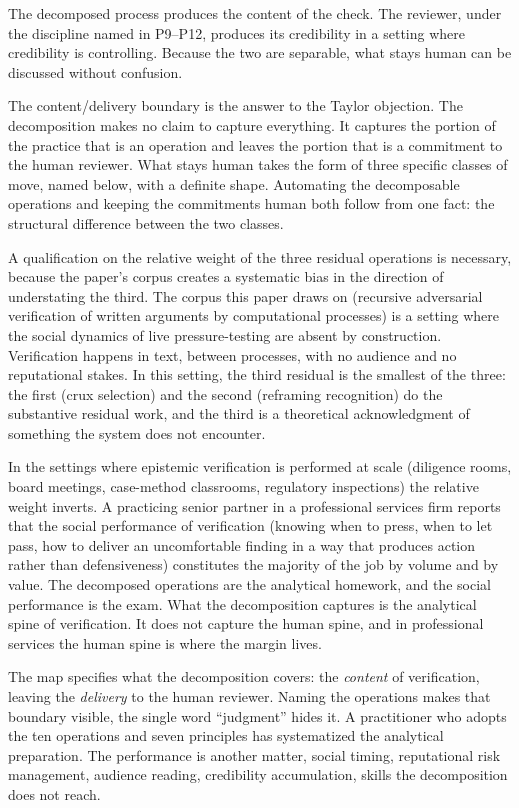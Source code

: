 \documentclass[
  11pt,
]{article}
\begin{document}
The decomposed process produces the content of the check. The reviewer,
under the discipline named in P9--P12, produces its credibility in a
setting where credibility is controlling. Because the two are separable,
what stays human can be discussed without confusion.

The content/delivery boundary is the answer to the Taylor
objection. The decomposition makes no claim to capture everything. It
captures the portion of the practice that is an operation and leaves the
portion that is a commitment to the human reviewer. What stays human takes
the form of three specific classes of move, named below, with a definite
shape. Automating the decomposable operations and keeping the commitments
human both follow from one fact: the structural difference between the two
classes.

A qualification on the relative weight of the three residual operations
is necessary, because the paper's corpus creates a systematic bias in the
direction of understating the third. The corpus this paper draws on
(recursive adversarial verification of written arguments by computational
processes) is a setting where the social dynamics of live pressure-testing
are absent by construction. Verification happens in text, between
processes, with no audience and no reputational stakes. In this setting,
the third residual is the smallest of the three: the first
(crux selection) and the second (reframing recognition) do the
substantive residual work, and the third is a theoretical acknowledgment
of something the system does not encounter.

In the settings where epistemic verification is performed at scale
(diligence rooms, board meetings, case-method classrooms, regulatory
inspections) the relative weight inverts. A practicing senior partner in a
professional services firm reports that the social performance of
verification (knowing when to press, when to let pass, how to deliver an
uncomfortable finding in a way that produces action rather than
defensiveness) constitutes the majority of the job by volume and by value.
The decomposed operations are the analytical homework, and the social
performance is the exam. What the decomposition captures is the analytical
spine of verification. It does not capture the human spine, and in
professional services the human spine is where the margin lives.

The map specifies what the decomposition covers: the \emph{content} of
verification, leaving the \emph{delivery} to the human reviewer. Naming
the operations makes that boundary visible, the single word ``judgment''
hides it. A practitioner who adopts the ten operations and seven
principles has systematized the analytical preparation. The performance is
another matter, social timing, reputational risk management, audience
reading, credibility accumulation, skills the decomposition does not
reach.
\end{document}
